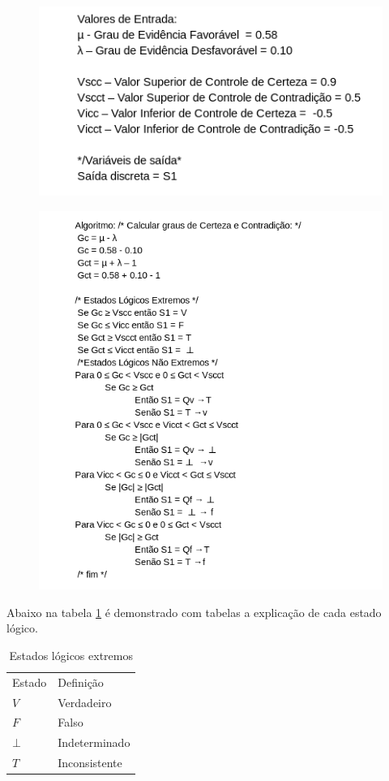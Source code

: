 \begin{figure}[htb]
	\includegraphics[scale=0.9]{imagens/codigo1.png}
\end{figure}

\begin{figure}[htb]
	\includegraphics[scale=0.9]{imagens/codigo2.png}
\end{figure}

\newpage

Abaixo na tabela \ref{tab:estadosle} é demonstrado com tabelas a explicação de cada estado lógico.


\begin{table}[htb]
	\centering
	\caption{Estados lógicos extremos}
	\label{tab:estadosle}
	\begin{tabular}{ll}
		Estado 		& Definição     \\
		$V$     	& Verdadeiro    \\
		$F$     	& Falso         \\
		$\bot$     	& Indeterminado \\
		$T$     	& Inconsistente
	\end{tabular}
\end{table}

